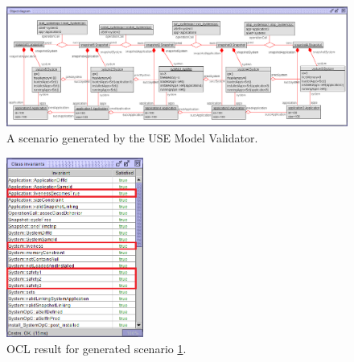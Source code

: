 \begin{figure}[H]
    \centering
    \includegraphics[width=1\textwidth]{figures/c3/CaseStudy_ObjectDiagram_2.png}
    \caption{A scenario generated by the USE Model Validator.}
    \label{fig:object_diagram_case_study}
\end{figure}

\begin{figure}[H]
    \centering
    \includegraphics[width=0.4\textwidth]{figures/c3/OCL_result_full_1_edited.png}
    \caption{OCL result for generated scenario \ref{fig:object_diagram_case_study}.}
    \label{fig:ocl_result_case_study}
\end{figure}